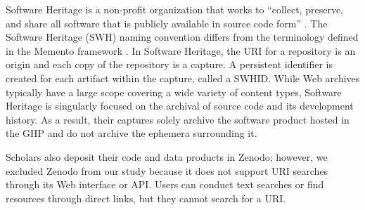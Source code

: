 Software Heritage is a non-profit organization that works to ``collect, preserve, and share all software that is publicly available in source code form'' \cite{swh-mission}. The Software Heritage (SWH) naming convention differs from the terminology defined in the Memento framework \cite{mementoprotocol}. In Software Heritage, the URI for a repository is an origin and each copy of the repository is a capture. A persistent identifier is created for each artifact within the capture, called a SWHID. While Web archives typically have a large scope covering a wide variety of content types, Software Heritage is singularly focused on the archival of source code and its development history. As a result, their captures solely archive the software product hosted in the GHP and do not archive the ephemera surrounding it. 

Scholars also deposit their code and data products in Zenodo; however, we excluded Zenodo from our study because it does not support URI searches through its Web interface or API. Users can conduct text searches or find resources through direct links, but they cannot search for a URI. 